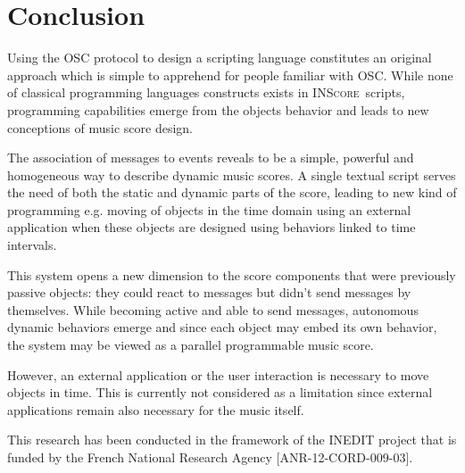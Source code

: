 \documentclass{article}
\newcommand{\inscore}		{\textsc{\small INScore}}
\begin{document}
\section{Conclusion}

Using the OSC protocol to design a scripting language constitutes an original approach which is simple to apprehend for people familiar with OSC. While none of classical programming languages constructs exists in \inscore\ scripts, programming capabilities emerge from the objects behavior and leads to new conceptions of music score design. 

The association of messages to events reveals to be a simple, powerful and homogeneous way to describe dynamic music scores. A single textual script serves the need of both the static and dynamic parts of the score, leading to new kind of programming e.g. moving of objects in the time domain using an external application when these objects are designed using behaviors linked to time intervals. 

This system opens a new dimension to the score components that were previously passive objects: they could react to messages but didn't send messages by themselves. While becoming active and able to send messages, autonomous dynamic behaviors emerge and since each object may embed its own behavior, the system may be viewed as a parallel programmable music score.

However, an external application or the user interaction is necessary to move objects in time. This is currently not considered as a limitation since external applications remain also necessary for the music itself.

%
\begin{acknowledgments}
This research has been conducted in the framework of the INEDIT project that is funded by the French National Research Agency [ANR-12-CORD-009-03].
\end{acknowledgments} 


\end{document}
